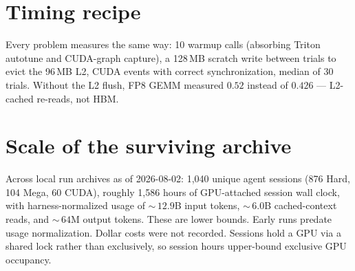 \documentclass[11pt]{article}
\begin{document}
\section{Timing recipe}
\label{app:timing}

Every problem measures the same way: 10 warmup calls (absorbing Triton autotune and CUDA-graph capture), a 128\,MB scratch write between trials to evict the 96\,MB L2, CUDA events with correct synchronization, median of 30 trials. Without the L2 flush, FP8 GEMM measured $0.52$ instead of $0.426$ --- L2-cached re-reads, not HBM.

\section{Scale of the surviving archive}
\label{app:scale}

Across local run archives as of 2026-08-02: 1{,}040 unique agent sessions (876 Hard, 104 Mega, 60 CUDA), roughly 1{,}586 hours of GPU-attached session wall clock, with harness-normalized usage of ${\sim}\,12.9$B input tokens, ${\sim}\,6.0$B cached-context reads, and ${\sim}\,64$M output tokens. These are lower bounds. Early runs predate usage normalization. Dollar costs were not recorded. Sessions hold a GPU via a shared lock rather than exclusively, so session hours upper-bound exclusive GPU occupancy.

\begingroup
\small


\endgroup
\end{document}
